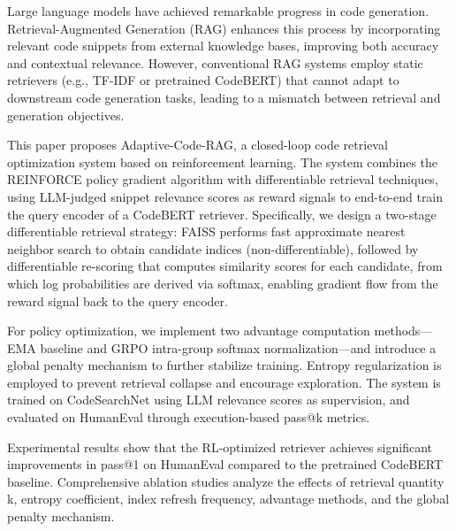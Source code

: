 \documentclass[
    fontset = win, %
  ]{njuthesis}
\begin{document}
\begin{abstract*}

Large language models have achieved remarkable progress in code generation. Retrieval-Augmented Generation (RAG) enhances this process by incorporating relevant code snippets from external knowledge bases, improving both accuracy and contextual relevance. However, conventional RAG systems employ static retrievers (e.g., TF-IDF or pretrained CodeBERT) that cannot adapt to downstream code generation tasks, leading to a mismatch between retrieval and generation objectives.

This paper proposes Adaptive-Code-RAG, a closed-loop code retrieval optimization system based on reinforcement learning. The system combines the REINFORCE policy gradient algorithm with differentiable retrieval techniques, using LLM-judged snippet relevance scores as reward signals to end-to-end train the query encoder of a CodeBERT retriever. Specifically, we design a two-stage differentiable retrieval strategy: FAISS performs fast approximate nearest neighbor search to obtain candidate indices (non-differentiable), followed by differentiable re-scoring that computes similarity scores for each candidate, from which log probabilities are derived via softmax, enabling gradient flow from the reward signal back to the query encoder.

For policy optimization, we implement two advantage computation methods---EMA baseline and GRPO intra-group softmax normalization---and introduce a global penalty mechanism to further stabilize training. Entropy regularization is employed to prevent retrieval collapse and encourage exploration. The system is trained on CodeSearchNet using LLM relevance scores as supervision, and evaluated on HumanEval through execution-based pass@k metrics.

Experimental results show that the RL-optimized retriever achieves significant improvements in pass@1 on HumanEval compared to the pretrained CodeBERT baseline. Comprehensive ablation studies analyze the effects of retrieval quantity k, entropy coefficient, index refresh frequency, advantage methods, and the global penalty mechanism.

\end{abstract*}

\tableofcontents

\mainmatter
\end{document}

